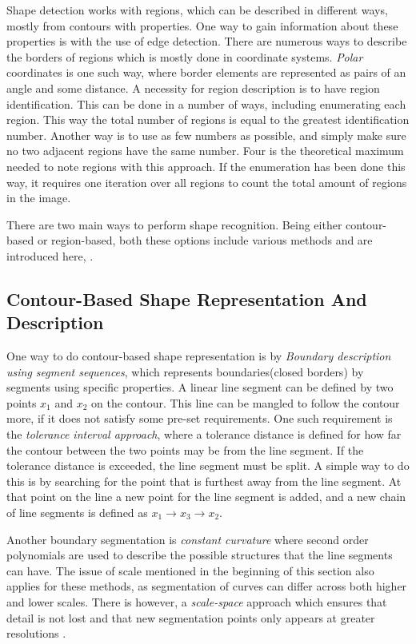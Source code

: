 Shape detection works with regions, which can be described in different ways, mostly from contours with properties. One way to gain information about these properties is with the use of edge detection.
There are numerous ways to describe the borders of regions which is mostly done in coordinate systems. \textit{Polar} coordinates is one such way, where border elements are represented as pairs of an angle and some distance.
A necessity for region description is to have region identification. This can be done in a number of ways, including enumerating each region. This way the total number of regions is equal to the greatest identification number. Another way is to use as few numbers as possible, and simply make sure no two adjacent regions have the same number. Four is the theoretical maximum needed to note regions with this approach. If the enumeration has been done this way, it requires one iteration over all regions to count the total amount of regions in the image.

There are two main ways to perform shape recognition. Being either contour-based or region-based,  both these options include various methods and are introduced here, .
\subsection{Contour-Based Shape Representation And Description}
One way to do contour-based shape representation is by \textit{Boundary description using segment sequences}, which represents boundaries(closed borders) by segments using specific properties. A linear line segment can be defined by two points $x_1$ and $x_2$ on the contour. This line can be mangled to follow the contour more, if it does not satisfy some pre-set requirements. One such requirement is the \textit{tolerance interval approach}, where a tolerance distance is defined for how far the contour between the two points may be from the line segment. If the tolerance distance is exceeded, the line segment must be split. A simple way to do this is by searching for the point that is furthest away from the line segment. At that point on the line a new point for the line segment is added, and a new chain of line segments is defined as $x_1 \rightarrow x_3 \rightarrow x_2$.

Another boundary segmentation is \textit{constant curvature} where second order polynomials are used to describe the possible structures that the line segments can have. The issue of scale mentioned in the beginning of this section also applies for these methods, as segmentation of curves can differ across both higher and lower scales. There is however, a \textit{scale-space} approach which ensures that detail is not lost and that new segmentation points only appears at greater resolutions .

